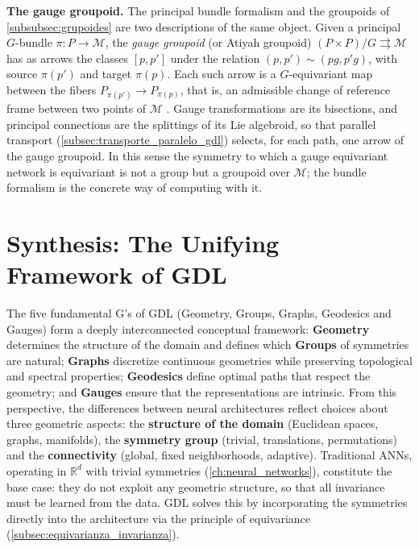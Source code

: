\textbf{The gauge groupoid.} The principal bundle formalism and the groupoids of \autoref{subsubsec:grupoides} are two descriptions of the same object. Given a principal $G$-bundle $\pi: P \to \mathcal{M}$, the \textit{gauge groupoid} (or Atiyah groupoid) $(P \times P)/G \rightrightarrows \mathcal{M}$ has as arrows the classes $[p, p']$ under the relation $(p, p') \sim (pg, p'g)$, with source $\pi(p')$ and target $\pi(p)$. Each such arrow is a $G$-equivariant map between the fibers $P_{\pi(p')} \to P_{\pi(p)}$, that is, an admissible change of reference frame between two points of $\mathcal{M}$ \citep{mackenzie2005general, brown2002jauge}. Gauge transformations are its bisections, and principal connections are the splittings of its Lie algebroid, so that parallel transport (\autoref{subsec:transporte_paralelo_gdl}) selects, for each path, one arrow of the gauge groupoid. In this sense the symmetry to which a gauge equivariant network is equivariant is not a group but a groupoid over $\mathcal{M}$; the bundle formalism is the concrete way of computing with it.


\section{Synthesis: The Unifying Framework of GDL}\label{sec:sintesis_marco_unificador}

The five fundamental G's of \gls{GDL} (Geometry, Groups, Graphs, Geodesics and Gauges) form a deeply interconnected conceptual framework: \textbf{Geometry} determines the structure of the domain and defines which \textbf{Groups} of symmetries are natural; \textbf{Graphs} discretize continuous geometries while preserving topological and spectral properties; \textbf{Geodesics} define optimal paths that respect the geometry; and \textbf{Gauges} ensure that the representations are intrinsic. From this perspective, the differences between neural architectures reflect choices about three geometric aspects: the \textbf{structure of the domain} (Euclidean spaces, graphs, manifolds), the \textbf{symmetry group} (trivial, translations, permutations) and the \textbf{connectivity} (global, fixed neighborhoods, adaptive). Traditional \glspl{ANN}, operating in $\mathbb{R}^d$ with trivial symmetries (\autoref{ch:neural_networks}), constitute the base case: they do not exploit any geometric structure, so that all invariance must be learned from the data. \gls{GDL} solves this by incorporating the symmetries directly into the architecture via the principle of equivariance (\autoref{subsec:equivarianza_invarianza}).

